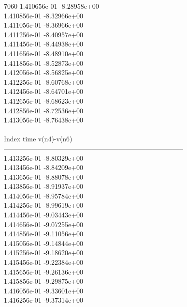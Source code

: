 7060	1.410656e-01	-8.28958e+00	\\ 	1.410856e-01	-8.32966e+00	\\ 	1.411056e-01	-8.36966e+00	\\ 	1.411256e-01	-8.40957e+00	\\ 	1.411456e-01	-8.44938e+00	\\ 	1.411656e-01	-8.48910e+00	\\ 	1.411856e-01	-8.52873e+00	\\ 	1.412056e-01	-8.56825e+00	\\ 	1.412256e-01	-8.60768e+00	\\ 	1.412456e-01	-8.64701e+00	\\ 	1.412656e-01	-8.68623e+00	\\ 	1.412856e-01	-8.72536e+00	\\ 	1.413056e-01	-8.76438e+00	\\ \hline
\\ \hline
Index   time            v(n4)-v(n6)     \\ \hline
--------------------------------------------------------------------------------\\ 	1.413256e-01	-8.80329e+00	\\ 	1.413456e-01	-8.84209e+00	\\ 	1.413656e-01	-8.88078e+00	\\ 	1.413856e-01	-8.91937e+00	\\ 	1.414056e-01	-8.95784e+00	\\ 	1.414256e-01	-8.99619e+00	\\ 	1.414456e-01	-9.03443e+00	\\ 	1.414656e-01	-9.07255e+00	\\ 	1.414856e-01	-9.11056e+00	\\ 	1.415056e-01	-9.14844e+00	\\ 	1.415256e-01	-9.18620e+00	\\ 	1.415456e-01	-9.22384e+00	\\ 	1.415656e-01	-9.26136e+00	\\ 	1.415856e-01	-9.29875e+00	\\ 	1.416056e-01	-9.33601e+00	\\ 	1.416256e-01	-9.37314e+00	\\ \hline
